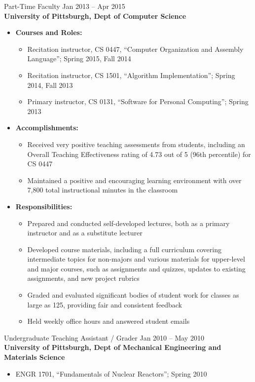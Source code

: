 \documentclass[11pt]{article}
\begin{document}
\selectfont
Part-Time Faculty
	\hfill Jan 2013 -- Apr 2015 \\
\normalfont
\textbf{University of Pittsburgh, Dept of Computer Science}
\begin{itemize}
	\item \textbf{Courses and Roles:}
		\begin{itemize}
			\item Recitation instructor, CS 0447, ``Computer Organization and Assembly Language'';
				Spring 2015, Fall 2014
			\item Recitation instructor, CS 1501, ``Algorithm Implementation'';
				Spring 2014, Fall 2013
			\item Primary instructor, CS 0131, ``Software for Personal Computing'';
				Spring 2013
		\end{itemize}
	\item \textbf{Accomplishments:}
		\begin{itemize}
			\item Received very positive teaching assessments from students,
				including an Overall Teaching Effectiveness rating of 4.73 out of 5
				(96th percentile) for CS 0447
			\item Maintained a positive and encouraging learning environment
				with over 7,800 total instructional minutes in the classroom
		\end{itemize}
	\item \textbf{Responsibilities:}
		\begin{itemize}
			\item Prepared and conducted self-developed lectures,
				both as a primary instructor and as a substitute lecturer
			\item Developed course materials, including a full curriculum
				covering intermediate topics for non-majors
				and various materials for upper-level and major courses,
				such as assignments and quizzes, updates to existing assignments,
				and new project rubrics
			\item Graded and evaluated significant bodies of student work
				for classes as large as 125, providing fair and consistent feedback
			\item Held weekly office hours and answered student emails
		\end{itemize}
\end{itemize}

\selectfont
Undergraduate Teaching Assistant / Grader
	\hfill Jan 2010 -- May 2010 \\
\normalfont
\textbf{University of Pittsburgh, Dept of Mechanical Engineering and Materials Science}
\begin{itemize}
	\item ENGR 1701, ``Fundamentals of Nuclear Reactors''; Spring 2010
\end{itemize}
\end{document}
